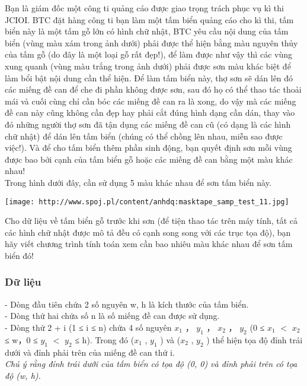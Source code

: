 



   Bạn là giám đốc một công ti quảng cáo được giao trọng trách phục vụ kì thi JCIOI. BTC đặt hàng công ti bạn làm một tấm biển quảng cáo cho kì thi, tấm biển này là một tấm gỗ lớn có hình chữ nhật, BTC yêu cầu nội dung của tấm biển (vùng màu xám trong ảnh dưới) phải được thể hiện bằng màu nguyên thủy của tấm gỗ (do đây là một loại gỗ rất đẹp!), để làm được như vậy thì các vùng xung quanh (vùng màu trắng trong ảnh dưới) phải được sơn màu khác biệt để làm bổi bật nội dung cần thể hiện. Để làm tấm biển này, thợ sơn sẽ dán lên đó các miếng đề can để che đi phần không được sơn, sau đó họ có thể thao tác thoải mái và cuối cùng chỉ cần bóc các miếng đề can ra là xong, do vậy mà các miếng đề can này cũng không cần đẹp hay phải cắt đúng hình dạng cần dán, thay vào đó những người thợ sơn đã tận dụng các miếng đề can cũ (có dạng là các hình chữ nhật) để dán lên tấm biển (chúng có thể chồng lên nhau, miễn sao được việc!). Và để cho tấm biển thêm phần sinh động, bạn quyết định sơn mỗi vùng được bao bởi cạnh của tấm biển gỗ hoặc các miếng đề can bằng một màu khác nhau!   
\\   Trong hình dưới đây, cần sử dụng 5 màu khác nhau để sơn tấm biển này.  


\texttt{[image: http://www.spoj.pl/content/anhdq:masktape\_samp\_test\_11.jpg]}



   Cho dữ liệu về tấm biển gỗ trước khi sơn (để tiện thao tác trên máy tính, tất cả các hình chữ nhật được mô tả đều có cạnh song song với các trục tọa độ), bạn hãy viết chương trình tính toán xem cần bao nhiêu màu khác nhau để sơn tấm biển đó!  

\subsubsection{   Dữ liệu  }

   - Dòng đầu tiên chứa 2 số nguyên w, h là kích thước của tấm biển.   
\\   - Dòng thứ hai chứa số n là số miếng đề can được sử dụng.   
\\   - Dòng thứ 2 + i (1 ≤ i ≤ n) chứa 4 số nguyên $x_{1}$   ， $y_{1}$   ， $x_{2}$   ， $y_{2}$   (0 ≤ $x_{1}$   $<$ $x_{2}$   ≤ w，0 ≤ $y_{1}$   $<$ $y_{2}$   ≤ h). Trong đó ($x_{1}$   , $y_{1}$   ) và ($x_{2}$   , $y_{2}$   ) thể hiện tọa độ đỉnh trái dưới và đỉnh phải trên của miếng đề can thứ i.   
\\\textit{     Chú ý rằng đỉnh trái dưới của tấm biển có tọa độ (0, 0) và đỉnh phải trên có tọa độ (w, h).    }

